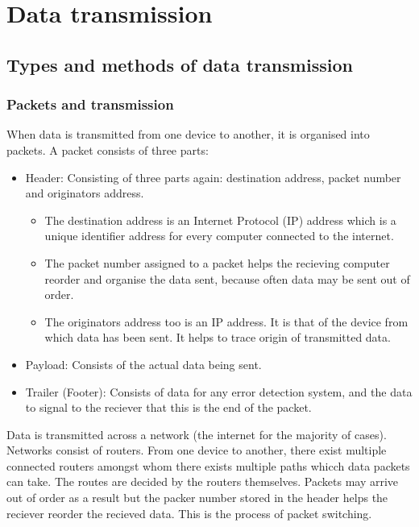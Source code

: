 \documentclass{article}
\begin{document}
\section{Data transmission}
\subsection{Types and methods of data transmission}
\subsubsection{Packets and transmission}
When data is transmitted from one device to another, it is organised into packets. A 
packet consists of three parts:
\begin{itemize}
	\item Header: Consisting of three parts again: destination address, packet number and
		originators address. 

		\begin{itemize}
		\item The destination address is an Internet Protocol (IP) address which is a 
			unique identifier address for every computer connected to the internet.
		
		\item The packet number assigned to a packet helps the recieving computer reorder and
		organise the data sent, because often data may be sent out of order.

		\item The originators address too is an IP address. It is that of the device from which
		data has been sent. It helps to trace origin of transmitted data.
		\end{itemize}
	\item Payload: Consists of the actual data being sent.
	\item Trailer (Footer): Consists of data for any error detection system, and the 
		data to signal to the reciever that this is the end of the packet.
\end{itemize}

Data is transmitted across a network (the internet for the majority of cases). Networks
consist of routers. From one device to another, there exist multiple connected routers
amongst whom there exists multiple paths whicch data packets can take. The routes are
decided by the routers themselves. Packets may arrive out of order as a result but the
packer number stored in the header helps the reciever reorder the recieved data. This is
the process of packet switching.
\end{document}
